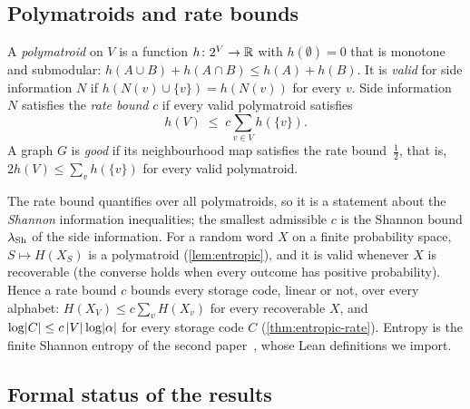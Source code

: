 \subsection{Polymatroids and rate bounds}\label{sec:prelim-polymatroids}

\begin{definition}\label{def:polymatroid}
A \emph{polymatroid} on $V$ is a function $h\colon 2^V\to\mathbb{R}$ with $h(\emptyset)=0$ that is monotone and submodular:
$h(A\cup B)+h(A\cap B)\le h(A)+h(B)$. It is \emph{valid} for side information $N$ if $h(N(v)\cup\{v\})=h(N(v))$ for every
$v$. Side information $N$ satisfies the \emph{rate bound} $c$ if every valid polymatroid satisfies
\[
  h(V)\;\le\;c\sum_{v\in V}h(\{v\}).
\]
A graph $G$ is \emph{good} if its neighbourhood map satisfies the rate bound~$\tfrac12$, that is, $2h(V)\le\sum_vh(\{v\})$ for
every valid polymatroid.
\end{definition}

The rate bound quantifies over all polymatroids, so it is a statement about the \emph{Shannon} information
inequalities; the smallest admissible $c$ is the Shannon bound $\lambda_{\mathrm{Sh}}$ of the side information.
For a random word $X$ on a finite probability space, $S\mapsto H(X_S)$ is a polymatroid (\cref{lem:entropic}),
and it is valid whenever $X$ is recoverable (the converse holds when every outcome has positive probability). Hence a rate bound $c$ bounds every storage code, linear or not, over
every alphabet: $H(X_V)\le c\sum_vH(X_v)$ for every recoverable $X$, and $\log\lvert C \rvert\le c\,\lvert V \rvert\log\lvert \alpha \rvert$
for every storage code $C$ (\cref{thm:entropic-rate}). Entropy is the finite Shannon entropy of the second
paper~\cite{SecondPaper2026}, whose Lean definitions we import.

\subsection{Formal status of the results}\label{sec:prelim-lean}

